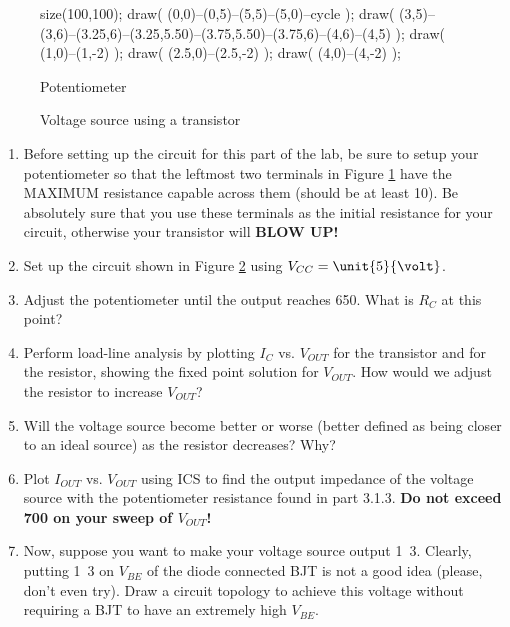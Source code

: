 \documentclass{article}
\begin{document}
	\begin{figure}[!htb]
		\begin{center}
			\begin{asy}
				size(100,100);
				draw( (0,0)--(0,5)--(5,5)--(5,0)--cycle );
				draw( (3,5)--(3,6)--(3.25,6)--(3.25,5.50)--(3.75,5.50)--(3.75,6)--(4,6)--(4,5) );
				draw( (1,0)--(1,-2) );
				draw( (2.5,0)--(2.5,-2) );
				draw( (4,0)--(4,-2) );
			\end{asy}
		\end{center}		
		\caption{Potentiometer}
		\label{lab6_pot}
	\end{figure}

	\begin{figure}[!htb]
		
		\centerline{\box\graph}
		\caption{Voltage source using a transistor}
		\label{lab6_vsource1}
	\end{figure}

\begin{enumerate}
	\item Before setting up the circuit for this part of the lab, be sure to setup your potentiometer so that the leftmost two terminals in Figure \ref{lab6_pot} have the MAXIMUM resistance capable across them (should be at least \unit{10}{\kilo\ohm}). Be absolutely sure that you use these terminals as the initial resistance for your circuit, otherwise your transistor will \textbf{BLOW UP!}
	\item Set up the circuit shown in Figure \ref{lab6_vsource1} using $V_{CC} = \unit{5}{\volt}$.
	\item Adjust the potentiometer until the output reaches \unit{650}{\milli\volt}. What is $R_C$ at this point?
	\item Perform load-line analysis by plotting $I_{C}$ vs. $V_{OUT}$ for the transistor and for the resistor, showing the fixed point solution for $V_{OUT}$. How would we adjust the resistor to increase $V_{OUT}$?
	\item Will the voltage source become better or worse (better defined as being closer to an ideal source) as the resistor decreases? Why?
	\item Plot $I_{OUT}$ vs. $V_{OUT}$ using ICS to find the output impedance of the voltage source with the potentiometer resistance found in part 3.1.3. \textbf{Do not exceed \unit{700}{\milli\volt} on your sweep of $V_{OUT}$!}
	\item Now, suppose you want to make your voltage source output \unit{1.3}{\volt}. Clearly, putting \unit{1.3}{\volt} on $V_{BE}$ of the diode connected BJT is not a good idea (please, don't even try). Draw a circuit topology to achieve this voltage without requiring a BJT to have an extremely high $V_{BE}$.
\end{enumerate}
\end{document}
